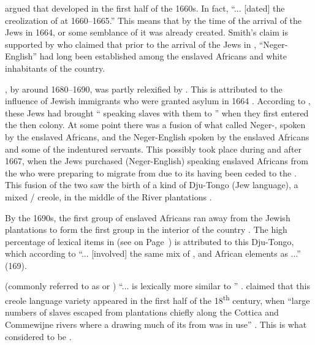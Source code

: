 \citet{Smith09, Smith06, Smith02} argued that  developed in the first half of the 1660s. In fact, \citet[316]{Smith09} ``... [dated] the creolization of  at 1660--1665.'' This means that by the time of the arrival of the  Jews in 1664,  or some semblance of it was already created. Smith's claim is supported by \citet[28]{Rens53} who claimed that prior to the arrival of the  Jews in , ``Neger-English'' had long been established among the enslaved Africans and white inhabitants of the country.

, by around 1680--1690, was partly relexified by . This is attributed to the influence of  Jewish immigrants who were granted asylum in 1664  \citep{McWhorter11, Smith06, Holm89}. According to  \citet[156]{Smith08b}, these  Jews had brought `` speaking slaves with them to '' when they first entered the then  colony. At some point there was a fusion of what \citet{Rens53} called Neger-, spoken by the  enslaved Africans, and the Neger-English spoken by the  enslaved Africans and some of the indentured servants. This possibly took place during and after 1667, when the  Jews purchased  (Neger-English) speaking enslaved Africans from the  who were preparing to migrate from  due to its having been ceded to the  \citep{Ehrlich09, Mufwene01, Friedman99, McWhorter98, Wurm96, Rens53}. This fusion of the two  saw the birth of a kind of Dju-Tongo (Jew language), a mixed / creole, in the middle of the  River plantations \citep{Arends95}.

By the 1690s, the first group of enslaved Africans ran away from the  Jewish plantations to form the first  group in the interior of the country \citep{Huber99}. The high percentage of  lexical items in  (see  on Page~\pageref{Table1.1}) is attributed to this Dju-Tongo, which according to \citet{Arends95} ``... [involved] the same mix of ,  and African elements as ...'' (169).

 (commonly referred to as  or ) ``... is lexically more similar to ''  \citep[Introduction]{Huttar94}. \citet{Huttar94} claimed that this creole language variety appeared in the first half of the 18\textsuperscript{th} century, when ``large numbers of slaves escaped from plantations chiefly along the Cottica and Commewijne rivers where a  drawing much of its  from  was in use'' \citep[Introduction]{Huttar94}. This  is what \citet{McWhorter98}  considered to be .

